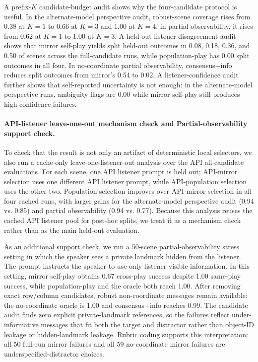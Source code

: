 A prefix-$K$ candidate-budget audit shows why the four-candidate protocol is useful. In the alternate-model perspective audit, robust-scene coverage rises from 0.38 at $K=1$ to 0.66 at $K=3$ and 1.00 at $K=4$; in partial observability, it rises from 0.62 at $K=1$ to 1.00 at $K=3$. A held-out listener-disagreement audit shows that mirror self-play yields split held-out outcomes in 0.08, 0.18, 0.36, and 0.50 of scenes across the full-candidate runs, while population-play has 0.00 split outcomes in all four. In no-coordinate partial observability, consensus+info reduces split outcomes from mirror's 0.54 to 0.02. A listener-confidence audit further shows that self-reported uncertainty is not enough: in the alternate-model perspective runs, ambiguity flags are 0.00 while mirror self-play still produces high-confidence failures.

\paragraph{API-listener leave-one-out mechanism check and Partial-observability support check.}
To check that the result is not only an artifact of deterministic local selectors, we also run a cache-only leave-one-listener-out analysis over the API all-candidate evaluations. For each scene, one API listener prompt is held out; API-mirror selection uses one different API listener prompt, while API-population selection uses the other two. Population selection improves over API-mirror selection in all four cached runs, with larger gains for the alternate-model perspective audit (0.94 vs. 0.85) and partial observability (0.94 vs. 0.77). Because this analysis reuses the cached API listener pool for post-hoc splits, we treat it as a mechanism check rather than as the main held-out evaluation.

As an additional support check, we run a 50-scene partial-observability stress setting in which the speaker sees a private landmark hidden from the listener. The prompt instructs the speaker to use only listener-visible information. In this setting, mirror self-play obtains 0.67 cross-play success despite 1.00 same-play success, while population-play and the oracle both reach 1.00. After removing exact row/column candidates, robust non-coordinate messages remain available: the no-coordinate oracle is 1.00 and consensus+info reaches 0.99. The candidate audit finds zero explicit private-landmark references, so the failures reflect under-informative messages that fit both the target and distractor rather than object-ID leakage or hidden-landmark leakage. Rubric coding supports this interpretation: all 50 full-run mirror failures and all 59 no-coordinate mirror failures are underspecified-distractor choices.

